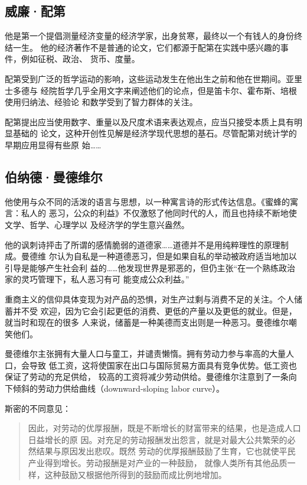 \subsection{威廉·配第}

他是第一个提倡测量经济变量的经济学家，出身贫寒，最终以一个有钱人的身份终结一生。
他的经济著作不是普通的论文，它们都源于配第在实践中感兴趣的事件，例如征税、政治、
货币、度量。

配第受到广泛的哲学运动的影响，这些运动发生在他出生之前和他在世期间。亚里士多德与
经院哲学几乎全用文字来阐述他们的论点，但是笛卡尔、霍布斯、培根使用归纳法、经验论
和数学受到了智力群体的关注。

配第提出应当使用数字、重量以及尺度术语来表达观点，应当只接受本质上具有明显基础的
论文，这种开创性见解是经济学现代思想的基石。尽管配第对统计学的早期应用显得有些原
始……

\subsection{伯纳德·曼德维尔}

他使用与众不同的活泼的语言与思想，以一种寓言诗的形式传达信息。《蜜蜂的寓言：私人的
恶习，公众的利益》不仅激怒了他同时代的人，而且也持续不断地使文学、哲学、心理学以
及经济学的学生意兴盎然。

他的讽刺诗抨击了所谓的感情脆弱的道德家……道德并不是用纯粹理性的原理制成。曼德维
尔认为自私是一种道德恶习，但是如果自私的举动被政府适当地加以引导是能够产生社会利
益的……他发现世界是邪恶的，但仍主张“在一个熟练政治家的灵巧管理下，私人恶习有可
能变成公众利益。”

重商主义的信仰具体变现为对产品的恐惧，对生产过剩与消费不足的关注。个人储蓄并不受
欢迎，因为它会引起更低的消费、更低的产量以及更低的就业。但是，就当时和现在的很多
人来说，储蓄是一种美德而支出则是一种恶习。曼德维尔嘲笑他们。

曼德维尔主张拥有大量人口与童工，并谴责懒惰。拥有劳动力参与率高的大量人口，会导致
低工资，这将使国家在出口与国际贸易方面具有竞争优势。低工资也保证了劳动的充足供给，
较高的工资将减少劳动供给。曼德维尔注意到了一条向下倾斜的劳动力供给曲线（downward-sloping labor curve）。

斯密的不同意见：
\begin{quotation}
  因此，对劳动的优厚报酬，既是不断增长的财富带来的结果，也是造成人口日益增长的原
  因。对充足的劳动报酬发出怨言，就是对最大公共繁荣的必然结果与原因发出悲叹。既然
  劳动的优厚报酬鼓励了生育，它也就使平民产业得到增长。劳动报酬是对产业的一种鼓励，
  就像人类所有其他品质一样，这种鼓励又根据他所得到的鼓励而成比例地增加。
\end{quotation}

